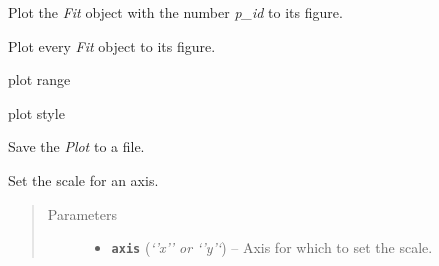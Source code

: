 \documentclass[a4paper,10pt,english]{sphinxmanual}
\begin{document}
\begin{fulllineitems}

\begin{fulllineitems}
\label{module_doc:kafe.plot.Plot.plot}
Plot the \emph{Fit} object with the number \emph{p\_id} to its figure.

\end{fulllineitems}


\begin{fulllineitems}
\label{module_doc:kafe.plot.Plot.plot_all}
Plot every \emph{Fit} object to its figure.

\end{fulllineitems}


\begin{fulllineitems}
\label{module_doc:kafe.plot.Plot.plot_range}
plot range

\end{fulllineitems}


\begin{fulllineitems}
\label{module_doc:kafe.plot.Plot.plot_style}
plot style

\end{fulllineitems}


\begin{fulllineitems}
\label{module_doc:kafe.plot.Plot.save}
Save the \emph{Plot} to a file.

\end{fulllineitems}


\begin{fulllineitems}
\label{module_doc:kafe.plot.Plot.set_axis_scale}
Set the scale for an axis.
\begin{quote}\begin{description}
\item[{Parameters}] \leavevmode\begin{itemize}
\item {} 
\textbf{\texttt{axis}} (\emph{`'x'' or `'y'`}) -- Axis for which to set the scale.


\end{itemize}
\end{description}
\end{quote}
\end{fulllineitems}
\end{fulllineitems}
\end{document}
